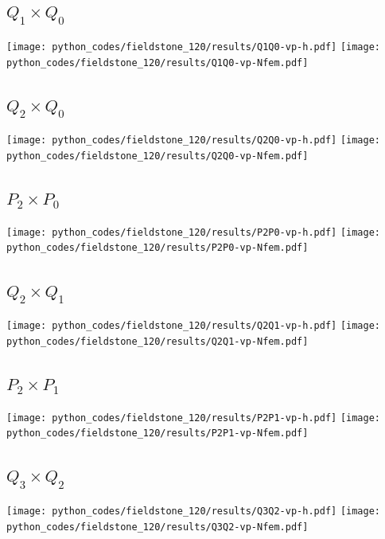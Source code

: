 \subsection*{$Q_1\times Q_0$}
\begin{center}
\texttt{[image: python\_codes/fieldstone\_120/results/Q1Q0-vp-h.pdf]}
\texttt{[image: python\_codes/fieldstone\_120/results/Q1Q0-vp-Nfem.pdf]}
\end{center}

\subsection*{$Q_2\times Q_0$}
\begin{center}
\texttt{[image: python\_codes/fieldstone\_120/results/Q2Q0-vp-h.pdf]}
\texttt{[image: python\_codes/fieldstone\_120/results/Q2Q0-vp-Nfem.pdf]}
\end{center}

\subsection*{$P_2\times P_0$}
\begin{center}
\texttt{[image: python\_codes/fieldstone\_120/results/P2P0-vp-h.pdf]}
\texttt{[image: python\_codes/fieldstone\_120/results/P2P0-vp-Nfem.pdf]}
\end{center}

\subsection*{$Q_2\times Q_1$}
\begin{center}
\texttt{[image: python\_codes/fieldstone\_120/results/Q2Q1-vp-h.pdf]}
\texttt{[image: python\_codes/fieldstone\_120/results/Q2Q1-vp-Nfem.pdf]}
\end{center}

\subsection*{$P_2\times P_1$}
\begin{center}
\texttt{[image: python\_codes/fieldstone\_120/results/P2P1-vp-h.pdf]}
\texttt{[image: python\_codes/fieldstone\_120/results/P2P1-vp-Nfem.pdf]}
\end{center}

\subsection*{$Q_3\times Q_2$}
\begin{center}
\texttt{[image: python\_codes/fieldstone\_120/results/Q3Q2-vp-h.pdf]}
\texttt{[image: python\_codes/fieldstone\_120/results/Q3Q2-vp-Nfem.pdf]}
\end{center}

